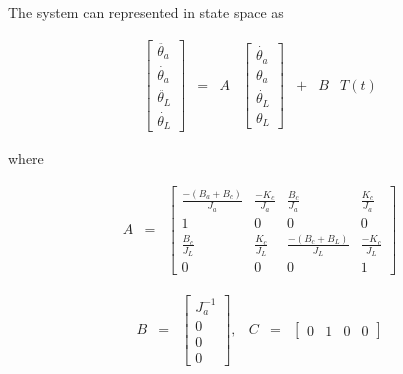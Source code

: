 \noindent The system can represented in state space as

\begin{equation}\label{eq:ssTR}
\begin{array}{lllllll}

\left[
\begin{array}{l}
\ddot{\theta_a} 	\\ 
\dot{\theta_a}		\\
\ddot{\theta_L}	\\
\dot{\theta_L}
\end{array}
\right]



&


=

&

A

&

\left[
\begin{array}{l}
\dot{\theta_a} 	\\ 
\theta_a		\\
\dot{\theta_L}	\\
\theta_L
\end{array}
\right]

&

+

&

B

&

T(t)


\end{array}
\end{equation}


where


\begin{equation}
\begin{array}{lll}
A
&
=
&

\left[
\begin{array}{cccc}
\frac{-(B_a+B_c)}{J_a}   	& \frac{-K_c}{J_a}   	& \frac{B_c}{J_a}   		&	\frac{K_c}{J_a} \\
1 					& 0				& 0					&	0			\\
\frac{B_c}{J_L}			& \frac{K_c}{J_L}	& \frac{-(B_c+B_L)}{J_L}	& 	\frac{-K_c}{J_L} \\
0					& 0				& 0					&	1		
\end{array}

\right]


\end{array}
\end{equation}



\begin{equation}
\begin{array}{lllrrr}
B

&

=

&

\left[
\begin{array}{r}
J^{-1}_a 	\\ 
0		\\
0	\\
0
\end{array}
\right]
,
&
C
&
=
&
\left[
\begin{array}{cccc}
0 	&	1	&	0	&	0
\end{array}
\right]




\end{array}
\end{equation}